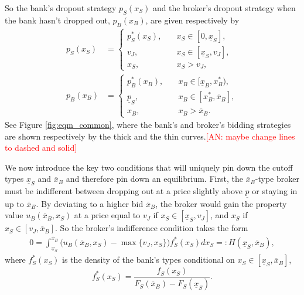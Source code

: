 \documentclass[11pt,twopage]{article}
\newcommand{\AN}[1]{\textcolor{red}{[AN: #1]}}
\newcommand{\ol}{\overline}
\newcommand{\ul}{\underline}
\begin{document}
So the bank's dropout strategy $p_S(x_S)$ and the broker's dropout
strategy when the bank hasn't dropped out, $p_B(x_B)$, are given
respectively by
\begin{align}
  p_S(x_S) & =
  \begin{cases}
    p_S^*(x_S), & \quad x_S \in [0, \underline x_S], \\
    v_J,        & \quad x_S\in[\underline x_S,v_J],\\
    x_S , & \quad x_S>v_J,
  \end{cases} \nonumber \\
  p_B(x_B) & =
  \begin{cases}
    p_B^*(x_B), & \quad x_B \in [\underline x_B, x_B^*), \\
    \ul p_S,        & \quad x_B\in[x_B^*,\overline x_B] ,\\
    x_B , & \quad x_B>\overline x_B.
  \end{cases}
  \label{eq:strategies}
\end{align}
See Figure \ref{fig:eqm_common}, where the bank's and broker's bidding
strategies are shown respectively by the thick and the thin
curves.\AN{maybe change lines to dashed and solid}



We now introduce the key two conditions that will uniquely pin down
the cutoff types $\underline x_S$ and $\ol x_B$ and therefore pin down
an equilibrium.  First, the $\ol x_B$-type broker must be indifferent
between dropping out at a price slightly above $\ul p$ or staying in
up to $\ol x_B$. By deviating to a higher bid $\ol x_B$, the broker
would gain the property value $u_B(\ol x_B,x_S)$ at a price equal to
$v_J$ if $x_S \in [\underline x_S,v_J]$, and $x_S$ if $x_S \in
[v_J,\ol x_B]$. So the broker's indifference condition takes the form
\begin{align}
  0 = \int_{\underline x_S}^{\ol x_B} \Big( u_B(\ol x_B,x_S)- \max \{
  v_J , x_S \}\Big) f_S^*(x_S)d x_S =: H(\underline x_S,\ol
  x_B), \label{eq:bindif0}
\end{align}
where $f_S^*(x_S)$ is the density of the bank's types conditional on
$x_S \in [\ul x_S,\ol x_B]$,
\[ f_S^*(x_S) = \frac{f_S(x_S)}{F_S(\overline x_B)-F_S(\underline
  x_S)}.\]
\end{document}
